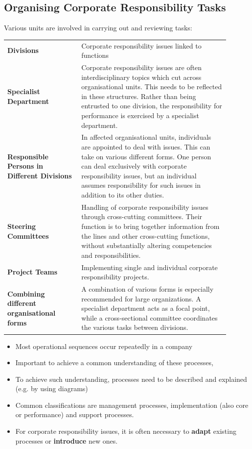 \documentclass[11pt]{article}
\theoremstyle{definition}
\begin{document}
\subsection{Organising Corporate Responsibility Tasks}
Various units are involved in carrying out and reviewing tasks:
\begin{tabularx}{\linewidth}{p{0.3\linewidth} p{0.6\linewidth}}
	\textbf{Divisions} & Corporate responsibility issues linked to functions\\
	\textbf{Specialist Department} & Corporate responsibility issues are often interdisciplinary topics which cut across organisational units. This needs to be reflected in these structures. Rather than being entrusted to one division, the responsibility for performance is exercised by a specialist department.\\
	\textbf{Responsible Persons in Different Divisions} & In affected organisational units, individuals are appointed to deal with issues. This can take on various different forms. One person can deal exclusively with corporate responsibility issues, but an individual assumes responsibility for such issues in addition to its other duties.\\
	\textbf{Steering Committees} & Handling of corporate responsibility issues through cross-cutting committees. Their function is to bring together information from the lines and other cross-cutting functions, without substantially altering competencies and responsibilities.\\
	\textbf{Project Teams} & Implementing single and individual corporate responsibility projects.\\
	\textbf{Combining different organisational forms} & A combination of various forms is especially recommended for large organizations. A specialist department acts as a focal point, while a cross-sectional committee coordinates the various tasks between divisions.
\end{tabularx}
\begin{itemize}
	\item Most operational sequences occur repeatedly in a company
	\item Important to achieve a common understanding of these processes,
	\item To achieve such understanding, processes need to be described and explained (e.g. by using diagrams)
	\item Common classifications are management processes, implementation (also core or performance) and support processes.
	\item For corporate responsibility issues, it is often necessary to \textbf{adapt} existing processes or \textbf{introduce} new ones.
\end{itemize}
\end{document}
